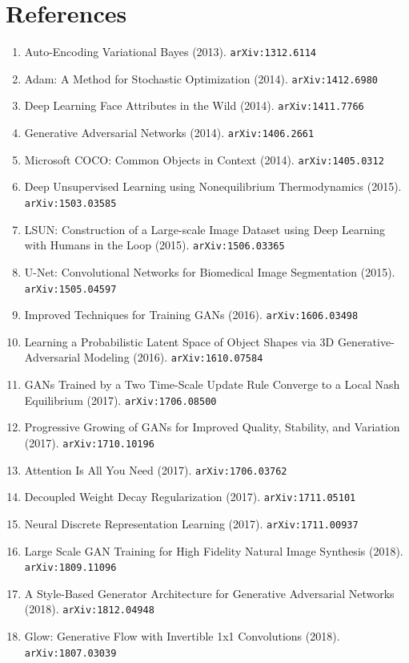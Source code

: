 \documentclass[11pt]{article}
\begin{document}
\section*{References}
\begin{enumerate}\small
  \item Auto-Encoding Variational Bayes (2013). \texttt{arXiv:1312.6114}
  \item Adam: A Method for Stochastic Optimization (2014). \texttt{arXiv:1412.6980}
  \item Deep Learning Face Attributes in the Wild (2014). \texttt{arXiv:1411.7766}
  \item Generative Adversarial Networks (2014). \texttt{arXiv:1406.2661}
  \item Microsoft COCO: Common Objects in Context (2014). \texttt{arXiv:1405.0312}
  \item Deep Unsupervised Learning using Nonequilibrium Thermodynamics (2015). \texttt{arXiv:1503.03585}
  \item LSUN: Construction of a Large-scale Image Dataset using Deep Learning
  with Humans in the Loop (2015). \texttt{arXiv:1506.03365}
  \item U-Net: Convolutional Networks for Biomedical Image Segmentation (2015). \texttt{arXiv:1505.04597}
  \item Improved Techniques for Training GANs (2016). \texttt{arXiv:1606.03498}
  \item Learning a Probabilistic Latent Space of Object Shapes via 3D
  Generative-Adversarial Modeling (2016). \texttt{arXiv:1610.07584}
  \item GANs Trained by a Two Time-Scale Update Rule Converge to a Local Nash
  Equilibrium (2017). \texttt{arXiv:1706.08500}
  \item Progressive Growing of GANs for Improved Quality, Stability, and
  Variation (2017). \texttt{arXiv:1710.10196}
  \item Attention Is All You Need (2017). \texttt{arXiv:1706.03762}
  \item Decoupled Weight Decay Regularization (2017). \texttt{arXiv:1711.05101}
  \item Neural Discrete Representation Learning (2017). \texttt{arXiv:1711.00937}
  \item Large Scale GAN Training for High Fidelity Natural Image Synthesis (2018). \texttt{arXiv:1809.11096}
  \item A Style-Based Generator Architecture for Generative Adversarial Networks (2018). \texttt{arXiv:1812.04948}
  \item Glow: Generative Flow with Invertible 1x1 Convolutions (2018). \texttt{arXiv:1807.03039}

\end{enumerate}
\end{document}
